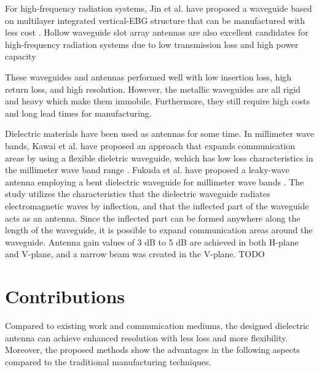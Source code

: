 \documentclass[a4paper,12pt]{report}
\begin{document}
For high-frequency radiation systems,
Jin et al. have proposed a waveguide
based on multilayer integrated vertical-EBG structure
that can be manufactured with less cost
\cite{9538996}.
Hollow waveguide slot array antennas are also
excellent candidates for high-frequency radiation systems due to low
transmission loss and high power capacity

These waveguides and antennas performed well with
low insertion loss, high return
loss, and high resolution.
However, the metallic waveguides are all rigid and heavy
which make them immobile.
Furthermore, they still require high costs and long lead times for manufacturing.

Dielectric materials have been used as antennas for some time.
In millimeter wave bands, Kawai et al. have proposed an approach that expands
communication areas by using a flexible dieletric waveguide,
wchich has low loss characteristics in the millimeter wave band range \cite{new_area_formation_approach}.
Fukuda et al. have proposed a leaky-wave antenna employing a bent dielectric waveguide for
millimeter wave bands \cite{leaky_wave_antenna_bent_dielectric}.
The study utilizes the characteristics that the
dielectric waveguide radiates electromagnetic waves by
inflection, and that the inflected part of the waveguide acts as
an antenna.
Since the inflected part can be formed anywhere along the length of
the waveguide, it is possible to expand communication areas
around the waveguide. 
Antenna gain values of 3 dB to 5 dB are
achieved in both H-plane and V-plane,
and a narrow beam was created in the V-plane.
TODO

\section{Contributions}

Compared to existing work and communication mediums,
the designed dielectric antenna can achieve
enhanced resolution with less loss and more flexibility.
Moreover, the proposed methods
show the advantages in the following aspects compared to the traditional
manufacturing techniques.
\end{document}

